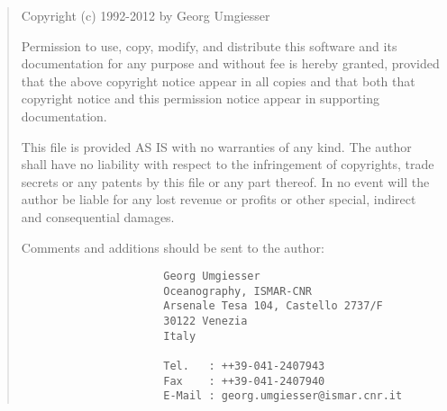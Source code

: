 
%
%
%
%
%
%
%

\begin{quotation}

   Copyright (c) 1992-2012 by Georg Umgiesser

   Permission to use, copy, modify, and distribute this software
   and its documentation for any purpose and without fee is hereby
   granted, provided that the above copyright notice appear in all
   copies and that both that copyright notice and this permission
   notice appear in supporting documentation.

   This file is provided AS IS with no warranties of any kind.
   The author shall have no liability with respect to the
   infringement of copyrights, trade secrets or any patents by
   this file or any part thereof.  In no event will the author
   be liable for any lost revenue or profits or other special,
   indirect and consequential damages.

   Comments and additions should be sent to the author:

        \begin{verbatim}
                      Georg Umgiesser                                  
                      Oceanography, ISMAR-CNR
                      Arsenale Tesa 104, Castello 2737/F
                      30122 Venezia
                      Italy

                      Tel.   : ++39-041-2407943
                      Fax    : ++39-041-2407940
                      E-Mail : georg.umgiesser@ismar.cnr.it
        \end{verbatim}
\end{quotation}


